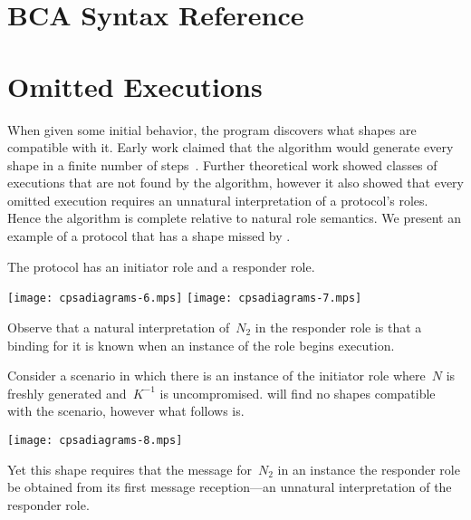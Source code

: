 \documentclass[12pt]{article}
\begin{document}
\appendix

\section{BCA Syntax Reference}\label{sec:syntax reference}



\section{Omitted Executions}\label{sec:omitted executions}

When given some initial behavior, the {\cpsa} program discovers what
shapes are compatible with it.  Early work claimed that the {\cpsa}
algorithm would generate every shape in a finite number of
steps~\cite{DoghmiGuttmanThayer07,Guttman11}.  Further theoretical
work showed classes of executions that are not found by the algorithm,
however it also showed that every omitted execution requires an
unnatural interpretation of a protocol's roles.  Hence the algorithm
is complete relative to natural role semantics.  We present an example
of a protocol that has a shape missed by {\cpsa}.

The protocol has an initiator role and a responder role.
\begin{center}
\texttt{[image: cpsadiagrams-6.mps]}\hfil
\texttt{[image: cpsadiagrams-7.mps]}
\end{center}

Observe that a natural interpretation of~$N_2$ in the responder role
is that a binding for it is known when an instance of the role begins
execution.

Consider a scenario in which there is an instance of the initiator
role where~$N$ is freshly generated and~$K^{-1}$ is uncompromised.
{\cpsa} will find no shapes compatible with the scenario, however what
follows is.
\begin{center}
\texttt{[image: cpsadiagrams-8.mps]}
\end{center}
Yet this shape requires that the message for~$N_2$ in an instance the
responder role be obtained from its first message reception---an
unnatural interpretation of the responder role.




\printindex
\end{document}
